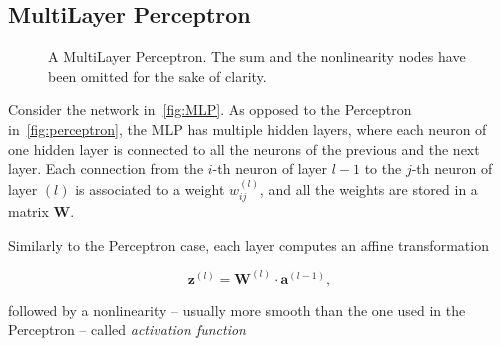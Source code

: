 \subsection{MultiLayer Perceptron}\label{sec:MLP}
\begin{figure}[t]
    \centering
    \begin{neuralnetwork} [nodespacing=7.5mm, layerspacing=23mm,
            maintitleheight=2.5em, layertitleheight=5em,
            height=3, toprow=true, nodesize=17pt,
            style={}, title={}, titlestyle={}]
        \hiddenlayer[count=3, bias=true, title=Layer 1, text=\nodetexthi]
        {\setdefaultlinklabel{\wijllink}\linklayers}
        \hiddenlayer[count=5, bias=true, title=Layer 2, text=\nodetexthi]
        {\setdefaultlinklabel{\wijllink}\linklayers}
        \hiddenlayer[count=4, bias=true, title=Layer 3, text=\nodetexthi]
        {\setdefaultlinklabel{\wijllink}\linklayers}
        \outputlayer[count=1, text=\nodetexty]
        {\setdefaultlinklabel{\wijllink}\linklayers}
    \end{neuralnetwork}
    \centering
    \caption{\label{fig:MLP}A MultiLayer Perceptron. The sum and the
        nonlinearity nodes have been omitted for the sake of clarity.
    }
\end{figure}

\noindent Consider the network in~\autoref{fig:MLP}. As opposed to the
Perceptron in~\autoref{fig:perceptron}, the MLP has multiple hidden layers,
where each neuron of one hidden layer is connected to all the neurons of the
previous and the next layer. Each connection from the $i$-th neuron of layer
$l-1$ to the $j$-th neuron of layer $(l)$ is associated to a weight
$w_{ij}^{(l)}$, and all the weights are stored in a matrix $\mathbf{W}$.

Similarly to the Perceptron case, each layer computes an affine transformation

\begin{equation}\label{eq:MLP_affine}
    \mathbf{z}^{(l)} = \mathbf{W}^{(l)} \cdot \mathbf{a}^{(l-1)},
\end{equation}

\noindent followed by a nonlinearity -- usually more smooth than the one
used in the Perceptron -- called \emph{activation function}

